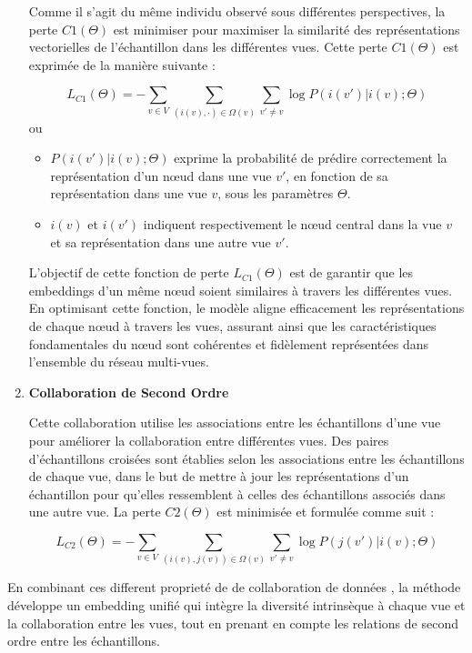 \begin{enumerate}
            Comme il s'agit du même individu observé sous différentes perspectives, la perte \( C1(\Theta) \) est minimiser  pour maximiser la similarité des représentations vectorielles de l'échantillon dans les différentes vues. Cette  perte \( C1(\Theta) \) est exprimée de la manière suivante :
    
            \begin{equation}
                L_{C1}(\Theta) = -\sum_{v \in V} \sum_{(i(v), \cdot) \in \Omega(v)} \sum_{v' \neq v} \log P(i(v') | i(v); \Theta)
            \end{equation}
           ou 
               \begin{itemize}
                \item \( P(i(v') | i(v); \Theta) \) exprime la probabilité de prédire correctement la représentation d'un nœud dans une vue \( v' \), en fonction de sa représentation dans une vue \( v \), sous les paramètres \( \Theta \).
                \item \( i(v) \) et \( i(v') \) indiquent respectivement le nœud central dans la vue \( v \) et sa représentation dans une autre vue \( v' \).
               \end{itemize}
           
           
            L'objectif de cette fonction de perte \( L_{C1}(\Theta) \) est de garantir que les embeddings d'un même nœud soient similaires à travers les différentes vues. En optimisant cette fonction, le modèle aligne efficacement les représentations de chaque nœud à travers les vues, assurant ainsi que les caractéristiques fondamentales du nœud sont cohérentes et fidèlement représentées dans l'ensemble du réseau multi-vues.

            
             \item \textbf{Collaboration de Second Ordre}
             
            Cette collaboration utilise les associations entre les échantillons d'une vue pour améliorer la collaboration entre différentes vues. Des paires d'échantillons croisées sont établies selon les associations entre les échantillons de chaque vue, dans le but de mettre à jour les représentations d'un échantillon pour qu'elles ressemblent à celles des échantillons associés dans une autre vue. La perte \( C2(\Theta) \) est minimisée et formulée comme suit :
            
            \begin{equation}
                L_{C2}(\Theta) = -\sum_{v \in V} \sum_{(i(v), j(v)) \in \Omega(v)} \sum_{v' \neq v} \log P(j(v') | i(v); \Theta)
            \end{equation}        
        \end{enumerate} 
        En combinant ces different proprieté de  de collaboration de données , la méthode développe un embedding unifié qui intègre la diversité intrinsèque à chaque vue et la collaboration entre les vues, tout en prenant en compte les relations de second ordre entre les échantillons.
        
